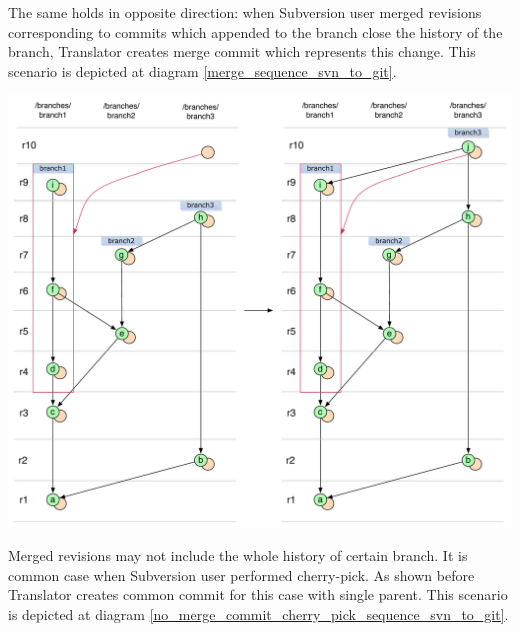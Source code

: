 The same holds in opposite direction: when Subversion user merged revisions corresponding to commits which appended to the branch close the history of the branch, Translator creates merge commit which represents this change. This scenario is depicted at diagram \ref{merge_sequence_svn_to_git}.

\begin{center}
\includegraphics[width=\textwidth]{img/diagrams/merge_sequence_svn_to_git.pdf}%
\label{merge_sequence_svn_to_git}%
\end{center}

Merged revisions may not include the whole history of certain branch. It is common case when Subversion user performed cherry-pick. As shown before Translator creates common commit for this case with single parent. This scenario is depicted at diagram \ref{no_merge_commit_cherry_pick_sequence_svn_to_git}.

